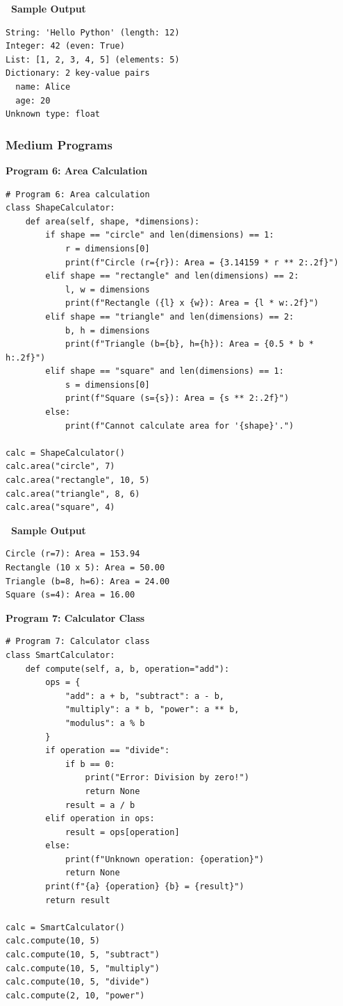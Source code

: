 \documentclass[12pt,a4paper]{article}
\newcommand{\outhead}{\noindent\colorbox{cmrgreen!25}%
  {\textbf{\small\color{cmrdark}~Sample Output~}}\par\vspace{-1pt}}
\begin{document}
\outhead
\begin{lstlisting}[style=outputstyle]
String: 'Hello Python' (length: 12)
Integer: 42 (even: True)
List: [1, 2, 3, 4, 5] (elements: 5)
Dictionary: 2 key-value pairs
  name: Alice
  age: 20
Unknown type: float
\end{lstlisting}

\subsubsection{Medium Programs}

\textbf{Program 6: Area Calculation}

\begin{lstlisting}
# Program 6: Area calculation
class ShapeCalculator:
    def area(self, shape, *dimensions):
        if shape == "circle" and len(dimensions) == 1:
            r = dimensions[0]
            print(f"Circle (r={r}): Area = {3.14159 * r ** 2:.2f}")
        elif shape == "rectangle" and len(dimensions) == 2:
            l, w = dimensions
            print(f"Rectangle ({l} x {w}): Area = {l * w:.2f}")
        elif shape == "triangle" and len(dimensions) == 2:
            b, h = dimensions
            print(f"Triangle (b={b}, h={h}): Area = {0.5 * b * h:.2f}")
        elif shape == "square" and len(dimensions) == 1:
            s = dimensions[0]
            print(f"Square (s={s}): Area = {s ** 2:.2f}")
        else:
            print(f"Cannot calculate area for '{shape}'.")

calc = ShapeCalculator()
calc.area("circle", 7)
calc.area("rectangle", 10, 5)
calc.area("triangle", 8, 6)
calc.area("square", 4)
\end{lstlisting}

\outhead
\begin{lstlisting}[style=outputstyle]
Circle (r=7): Area = 153.94
Rectangle (10 x 5): Area = 50.00
Triangle (b=8, h=6): Area = 24.00
Square (s=4): Area = 16.00
\end{lstlisting}

\vspace{0.5cm}

\textbf{Program 7: Calculator Class}

\begin{lstlisting}
# Program 7: Calculator class
class SmartCalculator:
    def compute(self, a, b, operation="add"):
        ops = {
            "add": a + b, "subtract": a - b,
            "multiply": a * b, "power": a ** b,
            "modulus": a % b
        }
        if operation == "divide":
            if b == 0:
                print("Error: Division by zero!")
                return None
            result = a / b
        elif operation in ops:
            result = ops[operation]
        else:
            print(f"Unknown operation: {operation}")
            return None
        print(f"{a} {operation} {b} = {result}")
        return result

calc = SmartCalculator()
calc.compute(10, 5)
calc.compute(10, 5, "subtract")
calc.compute(10, 5, "multiply")
calc.compute(10, 5, "divide")
calc.compute(2, 10, "power")
\end{lstlisting}
\end{document}
